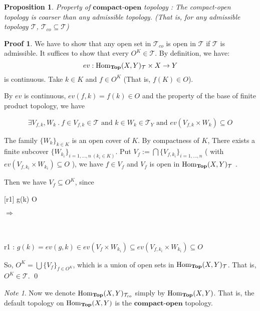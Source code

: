 \documentclass[a4paper]{article}
\theoremstyle{plain}
\newtheorem{prop}[thm]{Proposition}
\theoremstyle{definition}
\newtheorem*{prf}{Proof}
\theoremstyle{remark}
\newtheorem*{note}{Note}
\newcommand{\mc}[1]{\mathcal{#1}}
\newcommand{\mbf}[1]{\mathbf{#1}}
\newcommand{\mcT}{\mc T}
\newcommand{\E}{\exists}
\DeclareMathOperator{\Homtop}{\rm{Hom}_{\mbf{Top}}}
\begin{document}
    \begin{prop}
        Property of $\mbf{compact\text{-}open}$ topology : The compact-open topology
        is coarser than any admissible topology.
        (That is, for any admissible topology $\mcT$, $\mcT_{co} \subseteq \mcT$)
    \end{prop}
    \begin{prf}
        We have to show that any open set in $\mcT_{co}$ is open in $\mcT$ if $\mcT$ is admissible.
        It suffices to show that every $O^K \in \mcT$. By definition, we have:
        $$ ev : \Homtop(X,Y)_{\mcT} \times X \to Y $$
        is continuous. Take $k \in K$ and $f \in O^K$ (That is, $f(K) \in O$).
        \par By $ev$ is continuous,
        $ ev(f, k) = f(k) \in O$ and the property of the base of finite product topology,
        we have

        $$
        \E V_{f,k}, W_k \ .\ 
        f \in V_{f,k} \in \mcT \text{ and } k \in W_k \in \mcT_Y \text{ and } ev(V_{f,k} \times W_k) \subseteq O
        $$

        \par The family $\{W_k\}_{k \in K}$ is an open cover of $K$. By compactness of $K$,
        There exists a finite subcover $\{W_{k_i}\}_{i=1,\dots ,n\ (k_i \in K)}$. Put
        $V_f := \bigcap \{ V_{f,k_i} \}_{i=1,\dots ,n} $ ( with $ev(V_{f,k_i} \times W_{k_i}) \subseteq O$ ), we have $f \in V_f$
        and $V_f$ is open in $\Homtop(X,Y)_{\mcT}$ .
        \par Then we have $V_f \subseteq O^K$, since \\
        \begin{center}
        \begin{prooftree}
            \infer1{ \E k_i \in K \ . \ k \in W_{k_i} }
            [r1]{ g(k) \in O }
        \end{prooftree}
        $\Rightarrow$
        \begin{prooftree}
        \end{prooftree}
        \ \\
        \ \\
        r1 : $g(k)=ev(g,k) \in ev(V_f \times W_{k_i}) \subseteq ev(V_{f,k_i} \times W_{k_i}) \subseteq O $\\
        \end{center}
        
        
        So, $O^K = \bigcup \{V_f\}_{f \in O^K}$, which is a union of open sets in $\Homtop(X,Y)_{\mcT}$.
        That is, $O^K \in \mcT$. 
        \qed
    \end{prf}

    \begin{note}
        Now we denote $\Homtop(X,Y)_{\mcT_{co}}$ simply by $\Homtop(X,Y)$.
        That is, the default topology on $\Homtop(X,Y)$ is the $\mbf{compact\text{-}open}$ topology.
    \end{note}

    
    
    
\end{document}
